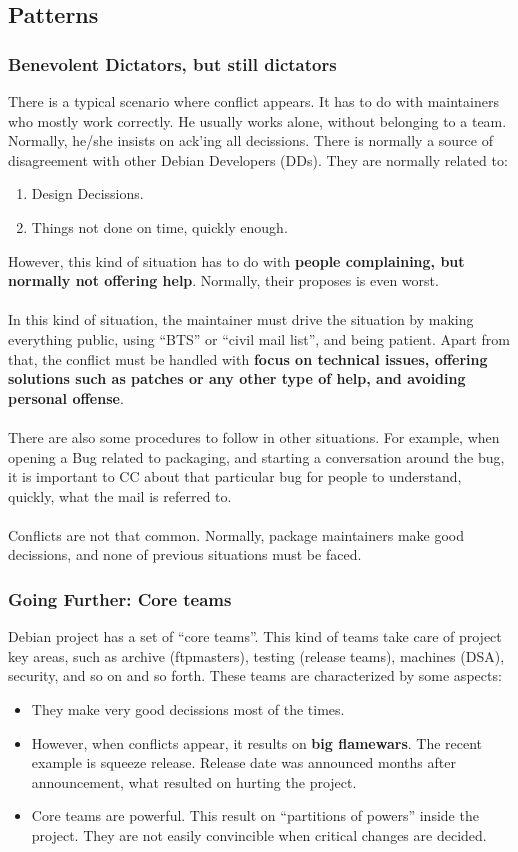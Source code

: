 \documentclass[11pt]{article}
\begin{document}
\subsection{Patterns}
\subsubsection{Benevolent Dictators, but still dictators}
There is a typical scenario where conflict appears. It has to do with maintainers who mostly work correctly. He usually works alone, without belonging to a team. Normally, he/she insists on ack'ing all decissions. There is normally a source of disagreement with other Debian Developers (DDs). They are normally related to:
\begin{enumerate}\itemsep0pt
\item{Design Decissions}.
\item{Things not done on time, quickly enough}.
\end{enumerate}
However, this kind of situation has to do with \textbf{people complaining, but normally not offering help}. Normally, their proposes is even worst.\\
\\
In this kind of situation, the maintainer must drive the situation by making everything public, using  ``BTS'' or ``civil mail list'', and being patient. Apart from that, the conflict must be handled with \textbf{focus on technical issues, offering solutions such as patches or any other type of help, and avoiding personal offense}.\\
\\
There are also some procedures to follow in other situations. For example, when opening a Bug related to packaging, and starting a conversation around the bug, it is important to CC about that particular bug for people to understand, quickly, what the mail is referred to.\\
\\
Conflicts are not that common. Normally, package maintainers make good decissions, and none of previous situations must be faced.

\subsubsection{Going Further: Core teams}
Debian project has a set of ``core teams''. This kind of teams take care of project key areas, such as archive (ftpmasters), testing (release teams), machines (DSA), security, and so on and so forth.
These teams are characterized by some aspects:
\begin{itemize}\itemsep0pt
\item{They make very good decissions most of the times}.
\item{However, when conflicts appear, it results on \textbf{big flamewars}}. The recent example is squeeze release. Release date was announced months after announcement, what resulted on hurting the project.
\item{Core teams are powerful}. This result on ``partitions of powers'' inside the project. They are not easily convincible when critical changes are decided.
\end{itemize}
\end{document}
